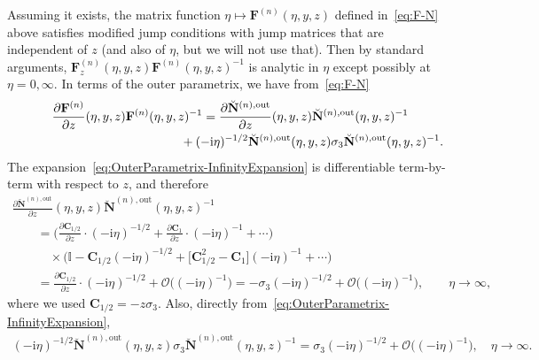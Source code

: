 \documentclass[11pt]{article}
\numberwithin{equation}{section}
\numberwithin{equation}{section}
\begin{document}
Assuming it exists, the matrix function $\eta\mapsto \mathbf{F}^{(n)}(\eta,y,z)$ defined in~\eqref{eq:F-N} above satisfies modified jump conditions with jump matrices that are independent of $z$ (and also of $\eta$, but we will not use that). Then by standard arguments, $\mathbf{F}^{(n)}_z(\eta,y,z)\mathbf{F}^{(n)}(\eta,y,z)^{-1}$ is analytic in $\eta$ except possibly at $\eta=0,\infty$. In terms of the outer parametrix, we have from~\eqref{eq:F-N}
\begin{gather*}
\frac{\partial\mathbf{F}^{(n)}}{\partial z}(\eta,y,z)\mathbf{F}^{(n)}(\eta,y,z)^{-1} = \frac{\partial\breve{\mathbf{N}}^{(n),\mathrm{out}}}{\partial z}(\eta,y,z)\breve{\mathbf{N}}^{(n),\mathrm{out}}(\eta,y,z)^{-1} \\
\hphantom{\frac{\partial\mathbf{F}^{(n)}}{\partial z}(\eta,y,z)\mathbf{F}^{(n)}(\eta,y,z)^{-1} =}{}
+ (-\mathrm{i}\eta)^{-1/2}\breve{\mathbf{N}}^{(n),\mathrm{out}}(\eta,y,z)\sigma_3\breve{\mathbf{N}}^{(n),\mathrm{out}}(\eta,y,z)^{-1}.
\end{gather*}
The expansion~\eqref{eq:OuterParametrix-InfinityExpansion} is differentiable term-by-term with respect to $z$, and therefore
\begin{gather*}
\frac{\partial\breve{\mathbf{N}}^{(n),\mathrm{out}}}{\partial z} (\eta,y,z)\breve{\mathbf{N}}^{(n),\mathrm{out}}(\eta,y,z)^{-1}\\
 \qquad{}= \bigg(\frac{\partial\mathbf{C}_{1/2}}{\partial z} \cdot(-\mathrm{i}\eta)^{-1/2} +\frac{\partial\mathbf{C}_1}{\partial z}\cdot (-\mathrm{i}\eta)^{-1} + \cdots\bigg) \\
 \qquad\quad{} \times\bigl(\mathbb{I}-\mathbf{C}_{1/2}(-\mathrm{i}\eta)^{-1/2} + \big[\mathbf{C}_{1/2}^2-\mathbf{C}_1\big](-\mathrm{i}\eta)^{-1} + \cdots\bigr)\\
 \qquad{} = \frac{\partial \mathbf{C}_{1/2}}{\partial z}\cdot (-\mathrm{i}\eta)^{-1/2} + \mathcal{O}\bigl((-\mathrm{i}\eta)^{-1}\bigr)
 = -\sigma_3(-\mathrm{i}\eta)^{-1/2}+\mathcal{O}\bigl((-\mathrm{i}\eta)^{-1}\bigr),\qquad\eta\to\infty,
\end{gather*}
where we used $\mathbf{C}_{1/2}=-z\sigma_3$. Also, directly from~\eqref{eq:OuterParametrix-InfinityExpansion},
\begin{gather*}
(-\mathrm{i}\eta)^{-1/2}\breve{\mathbf{N}}^{(n),\mathrm{out}}(\eta,y,z)\sigma_3\breve{\mathbf{N}}^{(n),\mathrm{out}}(\eta,y,z)^{-1}=\sigma_3 (-\mathrm{i}\eta)^{-1/2} + \mathcal{O}\bigl((-\mathrm{i}\eta)^{-1}\bigr),\quad\eta\to\infty.
\end{gather*}
\end{document}
